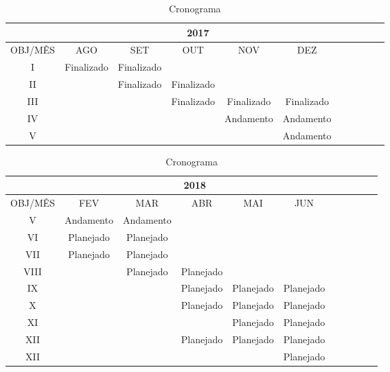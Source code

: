 \begin{table}[h!]
	\centering
	\caption{Cronograma}
	\label{my-label}
	\begin{tabular}{c|c|c|c|c|c|c|c|c|c|c|}
		\cline{2-6}
		& \multicolumn{5}{c|}{2017} \\ \hline
		\multicolumn{1}{|c|}{OBJ/MÊS} & AGO & SET & OUT & NOV & DEZ \\ \hline
		\multicolumn{1}{|c|}{I}		&Finalizado&Finalizado& & &\\ \hline
		\multicolumn{1}{|c|}{II}	&  &Finalizado&Finalizado& &\\ \hline
		\multicolumn{1}{|c|}{III}	&  & &Finalizado&Finalizado&Finalizado\\ \hline
		\multicolumn{1}{|c|}{IV}	&  & & &Andamento&Andamento\\ \hline
		\multicolumn{1}{|c|}{V}		&  & & & &Andamento\\ \hline
	\end{tabular}
\end{table}

\begin{table}[h!]
	\centering
	\caption{Cronograma}
	\label{my-label}
	\begin{tabular}{c|c|c|c|c|c|c|c|c|c|c|}
		\cline{2-6}
		& \multicolumn{5}{c|}{2018}   \\ \hline
		\multicolumn{1}{|c|}{OBJ/MÊS} & FEV & MAR & ABR & MAI & JUN \\ \hline
		\multicolumn{1}{|c|}{V}		&Andamento&Andamento& & &\\ \hline
		\multicolumn{1}{|c|}{VI}	&Planejado&Planejado& & &\\ \hline
		\multicolumn{1}{|c|}{VII}	&Planejado&Planejado& & &\\ \hline
		\multicolumn{1}{|c|}{VIII}	& &Planejado&Planejado& &\\ \hline
		\multicolumn{1}{|c|}{IX}	& & &Planejado&Planejado&Planejado\\ \hline
		\multicolumn{1}{|c|}{X}		& & &Planejado&Planejado&Planejado\\ \hline
		\multicolumn{1}{|c|}{XI}	& & & &Planejado&Planejado\\ \hline
		\multicolumn{1}{|c|}{XII}	& & &Planejado&Planejado&Planejado\\ \hline
		\multicolumn{1}{|c|}{XII}	& & & & &Planejado\\ \hline
	\end{tabular}
\end{table}